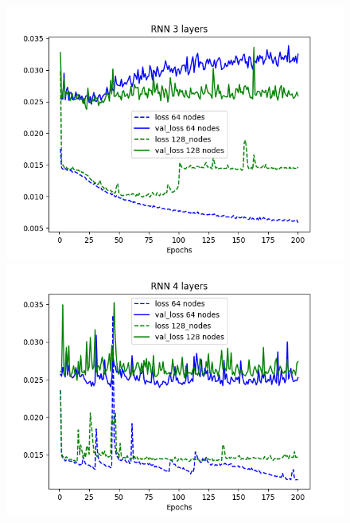 \documentclass[11pt]
{article}
\begin{document}
\begin{figure}[ht]
\begin{minipage}[b]{0.33\linewidth}
		\includegraphics[width=\linewidth]{../TESTS_RESULTS/RNN_tests/plots/3_comp.png} 
	\end{minipage}%
	\begin{minipage}[b]{0.33\linewidth}
		\centering
		\includegraphics[width=\linewidth]{../TESTS_RESULTS/RNN_tests/plots/4_comp.png} 
	\end{minipage} 
\end{figure}
\end{document}
